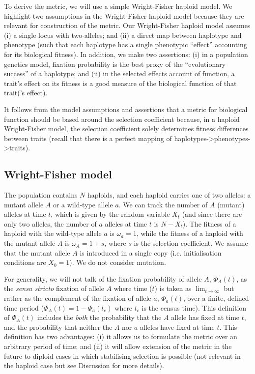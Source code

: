 \documentclass{article}
\begin{document}
To derive the metric, we will use a simple Wright-Fisher haploid model.
We highlight two assumptions in the Wright-Fisher haploid model because they are relevant for construction of the metric. Our Wright-Fisher haploid model assumes (i) a single locus with two-alleles; and (ii) a direct map between haplotype and phenotype (such that each haplotype has a single phenotypic ``effect'' accounting for its biological fitness).
In addition, we make two assertions: (i) in a population genetics model, fixation probability is the best proxy of the ``evolutionary success'' of a haplotype; and (ii) in the selected effects account of function, a trait's effect on its fitness is a good measure of the biological function of that trait('s effect).

It follows from the model assumptions and assertions that a metric for biological function should be based around the selection coefficient because, in a haploid Wright-Fisher model, the selection coefficient solely determines fitness differences between traits (recall that there is a perfect mapping of haplotypes->phenotypes->traits).

\subsection{Wright-Fisher model}
\label{sec:wright-fisher-model}

The population contains $N$ haploids, and each haploid carries one of two alleles: a mutant allele $A$ or a wild-type allele $a$.
We can track the number of $A$ (mutant) alleles at time $t$, which is given by the random variable $X_t$ (and since there are only two alleles, the number of $a$ alleles at time $t$ is $N-X_t$). 
The fitness of a haploid with the wild-type allele $a$ is $\omega_a = 1$, while the fitness of a haploid with the mutant allele $A$ is $\omega_A = 1 + s$, where $s$ is the selection coefficient.
We assume that the mutant allele $A$ is introduced in a single copy (i.e. initialisation conditions are $X_0 = 1$).
We do not consider mutation.

For generality, we will not talk of the fixation probability of allele $A$, $\Phi_A(t)$, as the \emph{sensu stricto} fixation of allele $A$ where time ($t$) is taken as $\lim_{t \to \infty}$ but rather as the complement of the fixation of allele $a$, $\Phi_a(t)$, over a finite, defined time period ($\Phi_A(t) = 1 -\Phi_a(t_c)$ where $t_c$ is the census time).
This definition of $\Phi_A(t)$ includes the \emph{both} the probability that the $A$ allele has fixed at time $t$, and the probability that neither the $A$ nor $a$ alleles have fixed at time $t$.
This definition has two advantages: (i) it allows us to formulate the metric over an arbitrary period of time; and (ii) it will allow extension of the metric in the future to diploid cases in which stabilising selection is possible (not relevant in the haploid case but see Discussion for more details).
\end{document}
